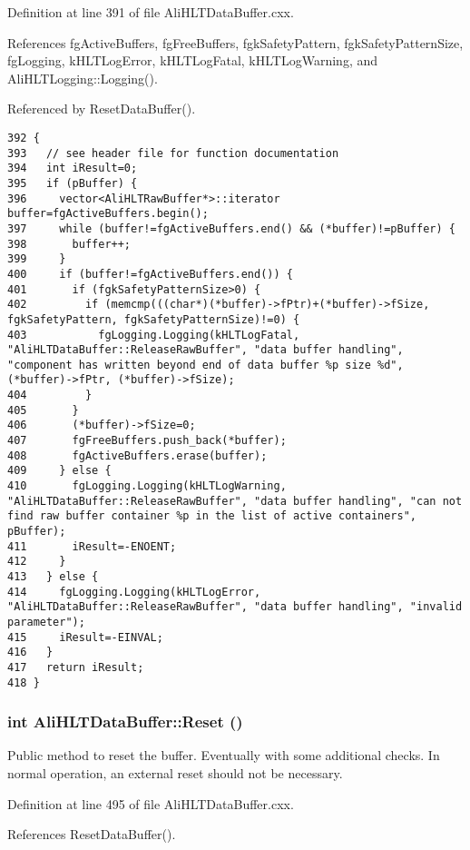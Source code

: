 Definition at line 391 of file Ali\-HLTData\-Buffer.cxx.

References fg\-Active\-Buffers, fg\-Free\-Buffers, fgk\-Safety\-Pattern, fgk\-Safety\-Pattern\-Size, fg\-Logging, k\-HLTLog\-Error, k\-HLTLog\-Fatal, k\-HLTLog\-Warning, and Ali\-HLTLogging::Logging().

Referenced by Reset\-Data\-Buffer().

\footnotesize\begin{verbatim}392 {
393   // see header file for function documentation
394   int iResult=0;
395   if (pBuffer) {
396     vector<AliHLTRawBuffer*>::iterator buffer=fgActiveBuffers.begin();
397     while (buffer!=fgActiveBuffers.end() && (*buffer)!=pBuffer) {
398       buffer++;
399     }
400     if (buffer!=fgActiveBuffers.end()) {
401       if (fgkSafetyPatternSize>0) {
402         if (memcmp(((char*)(*buffer)->fPtr)+(*buffer)->fSize, fgkSafetyPattern, fgkSafetyPatternSize)!=0) {
403           fgLogging.Logging(kHLTLogFatal, "AliHLTDataBuffer::ReleaseRawBuffer", "data buffer handling", "component has written beyond end of data buffer %p size %d", (*buffer)->fPtr, (*buffer)->fSize);
404         }
405       }
406       (*buffer)->fSize=0;
407       fgFreeBuffers.push_back(*buffer);
408       fgActiveBuffers.erase(buffer);
409     } else {
410       fgLogging.Logging(kHLTLogWarning, "AliHLTDataBuffer::ReleaseRawBuffer", "data buffer handling", "can not find raw buffer container %p in the list of active containers", pBuffer);
411       iResult=-ENOENT;
412     }
413   } else {
414     fgLogging.Logging(kHLTLogError, "AliHLTDataBuffer::ReleaseRawBuffer", "data buffer handling", "invalid parameter");
415     iResult=-EINVAL;
416   }
417   return iResult;
418 }
\end{verbatim}\normalsize 


\subsubsection{\setlength{\rightskip}{0pt plus 5cm}int Ali\-HLTData\-Buffer::Reset ()}\label{classAliHLTDataBuffer_a15}


Public method to reset the buffer. Eventually with some additional checks. In normal operation, an external reset should not be necessary. 

Definition at line 495 of file Ali\-HLTData\-Buffer.cxx.

References Reset\-Data\-Buffer().

